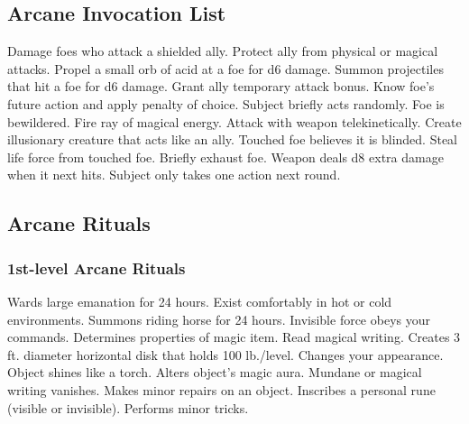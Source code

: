 \subsection{Arcane Invocation List}
\begin{swspelllist}
   Damage foes who attack a shielded ally.
   Protect ally from physical or magical attacks.
   Propel a small orb of acid at a foe for d6 damage.
   Summon projectiles that hit a foe for d6 damage.
   Grant ally temporary attack bonus.
   Know foe's future action and apply penalty of choice.
   Subject briefly acts randomly.
   Foe is bewildered.
   Fire ray of magical energy.
   Attack with weapon telekinetically.
   Create illusionary creature that acts like an ally.
   Touched foe believes it is blinded.
   Steal life force from touched foe.
   Briefly exhaust foe.
   Weapon deals d8 extra damage when it next hits.
   Subject only takes one action next round.
\end{swspelllist}

\subsection{Arcane Rituals}\label{Arcane Rituals}
\subsubsection{1st-level Arcane Rituals}
\begin{rituallist}
     Wards large emanation for 24 hours.
     Exist comfortably in hot or cold environments.
     Summons riding horse for 24 hours.
     Invisible force obeys your commands.
     Determines properties of magic item.
     Read magical writing.
     Creates 3 ft. diameter horizontal disk that holds 100 lb./level.
     Changes your appearance.
     Object shines like a torch.
     Alters object's magic aura.
     Mundane or magical writing vanishes.
     Makes minor repairs on an object.
     Inscribes a personal rune (visible or invisible).
     Performs minor tricks.
\end{rituallist}

